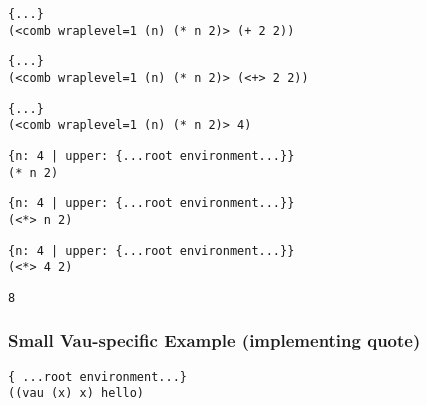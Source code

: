 \documentclass{beamer}
\begin{document}
\begin{frame}[fragile]
\footnotesize
\begin{verbatim}
{...}
(<comb wraplevel=1 (n) (* n 2)> (+ 2 2))
\end{verbatim}
\end{frame}

\begin{frame}[fragile]
\footnotesize
\begin{verbatim}
{...}
(<comb wraplevel=1 (n) (* n 2)> (<+> 2 2))
\end{verbatim}
\end{frame}

\begin{frame}[fragile]
\footnotesize
\begin{verbatim}
{...}
(<comb wraplevel=1 (n) (* n 2)> 4)
\end{verbatim}
\end{frame}

\begin{frame}[fragile]
\footnotesize
\begin{verbatim}
{n: 4 | upper: {...root environment...}}
(* n 2)
\end{verbatim}
\end{frame}

\begin{frame}[fragile]
\footnotesize
\begin{verbatim}
{n: 4 | upper: {...root environment...}}
(<*> n 2)
\end{verbatim}
\end{frame}

\begin{frame}[fragile]
\footnotesize
\begin{verbatim}
{n: 4 | upper: {...root environment...}}
(<*> 4 2)
\end{verbatim}
\end{frame}

\begin{frame}[fragile]
\footnotesize
\begin{verbatim}
8
\end{verbatim}
\end{frame}

\begin{frame}[fragile]
\frametitle{Small Vau-specific Example (implementing quote)}
\footnotesize
\begin{verbatim}
{ ...root environment...}
((vau (x) x) hello)
\end{verbatim}
\end{frame}
\end{document}
